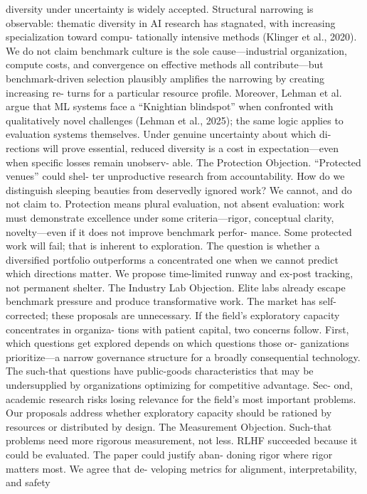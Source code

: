 diversity under uncertainty is widely accepted. Structural
narrowing is observable: thematic diversity in AI research
has stagnated, with increasing specialization toward compu-
tationally intensive methods (Klinger et al., 2020). We do
not claim benchmark culture is the sole cause—industrial
organization, compute costs, and convergence on effective
methods all contribute—but benchmark-driven selection
plausibly amplifies the narrowing by creating increasing re-
turns for a particular resource profile. Moreover, Lehman et
al. argue that ML systems face a “Knightian blindspot” when
confronted with qualitatively novel challenges (Lehman
et al., 2025); the same logic applies to evaluation systems
themselves. Under genuine uncertainty about which di-
rections will prove essential, reduced diversity is a cost in
expectation—even when specific losses remain unobserv-
able.
The Protection Objection. “Protected venues” could shel-
ter unproductive research from accountability. How do we
distinguish sleeping beauties from deservedly ignored work?
We cannot, and do not claim to. Protection means plural
evaluation, not absent evaluation: work must demonstrate
excellence under some criteria—rigor, conceptual clarity,
novelty—even if it does not improve benchmark perfor-
mance. Some protected work will fail; that is inherent to
exploration. The question is whether a diversified portfolio
outperforms a concentrated one when we cannot predict
which directions matter. We propose time-limited runway
and ex-post tracking, not permanent shelter.
The Industry Lab Objection. Elite labs already escape
benchmark pressure and produce transformative work. The
market has self-corrected; these proposals are unnecessary.
If the field’s exploratory capacity concentrates in organiza-
tions with patient capital, two concerns follow. First, which
questions get explored depends on which questions those or-
ganizations prioritize—a narrow governance structure for a
broadly consequential technology. The such-that questions
have public-goods characteristics that may be undersupplied
by organizations optimizing for competitive advantage. Sec-
ond, academic research risks losing relevance for the field’s
most important problems. Our proposals address whether
exploratory capacity should be rationed by resources or
distributed by design.
The Measurement Objection. Such-that problems need
more rigorous measurement, not less. RLHF succeeded
because it could be evaluated. The paper could justify aban-
doning rigor where rigor matters most. We agree that de-
veloping metrics for alignment, interpretability, and safety

